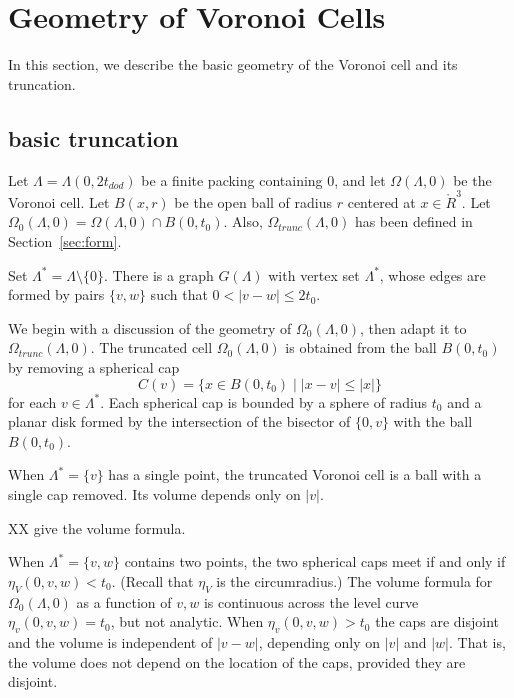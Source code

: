 \section{Geometry of Voronoi Cells}

In this section, we describe the basic geometry of the
 Voronoi cell and
its truncation.  

\subsection{basic truncation}

Let $\Lambda = \Lambda(0,2t_{dod})$ be a finite
packing containing $0$, and let $\Omega(\Lambda,0)$ be the Voronoi cell.
Let $B(x,r)$ be the open ball of
radius $r$ centered at $x\in\ring{R}^3$.
Let $\Omega_0(\Lambda,0) = \Omega(\Lambda,0)\cap B(0,t_0)$.
Also, $\Omega_{trunc}(\Lambda,0)$ 
has been defined in Section~\ref{sec:form}.


Set $\Lambda^* = \Lambda\setminus\{0\}$.  There is a graph $G(\Lambda)$
with vertex set $\Lambda^*$, whose edges are formed by pairs
$\{v,w\}$ such that $0<|v-w|\le 2t_0$.  

We begin with a discussion of the geometry of $\Omega_0(\Lambda,0)$,
then adapt it to $\Omega_{trunc}(\Lambda,0)$.  The truncated cell
$\Omega_0(\Lambda,0)$ is obtained from the ball $B(0,t_0)$ by
removing a spherical cap
   $$
   C(v) = \{x \in B(0,t_0) \mid  |x - v| \le |x| \}
   $$
for each $v\in\Lambda^*$.
Each spherical cap is bounded by a sphere of radius $t_0$ and
a planar disk formed by the intersection of the bisector of 
$\{0,v\}$ with the ball $B(0,t_0)$.

When $\Lambda^* = \{v\}$ has a single point, the truncated Voronoi
cell is a ball with a single cap removed.  Its volume depends
only on $|v|$.   

XX give the volume formula.

When $\Lambda^*=\{v,w\}$ contains two points, the two spherical
caps meet if and only if $\eta_V(0,v,w) < t_0$.  (Recall that
$\eta_V$ is the circumradius.)   The volume formula for
$\Omega_0(\Lambda,0)$ as a function of $v,w$ is continuous
across the level curve $\eta_v(0,v,w)=t_0$, but not analytic.
When $\eta_v(0,v,w) > t_0$ the caps are disjoint and the
volume is independent of $|v-w|$, depending only on $|v|$ and $|w|$.
That is, the volume does not depend on the location of the caps,
provided they are disjoint.

